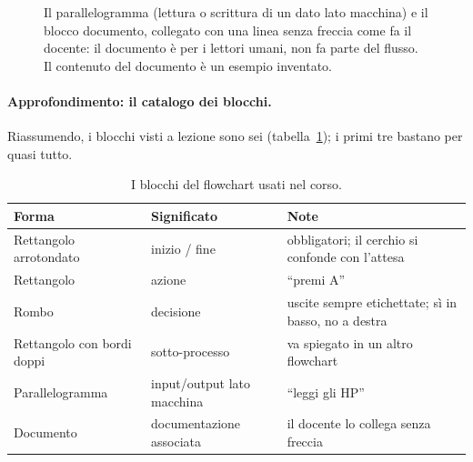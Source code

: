 \begin{figure}[htbp]
\centering
{}
\caption{Il parallelogramma (lettura o scrittura di un dato lato macchina) e
il blocco documento, collegato con una linea senza freccia come fa il
docente: il documento è per i lettori umani, non fa parte del flusso. Il
contenuto del documento è un esempio inventato.}
\label{fig:fc-io-documento}
\end{figure}

\paragraph{Approfondimento: il catalogo dei blocchi.} Riassumendo, i blocchi
visti a lezione sono sei (tabella~\ref{tab:blocchi-flowchart}); i primi
tre bastano per quasi tutto.

\begin{table}[htbp]
\centering
\small
\begin{tabular}{@{}llp{5.6cm}@{}}
\toprule
\textbf{Forma} & \textbf{Significato} & \textbf{Note} \\
\midrule
Rettangolo arrotondato & inizio / fine & obbligatori; il cerchio si
  confonde con l'attesa \\
Rettangolo & azione & ``premi A'' \\
Rombo & decisione & uscite sempre etichettate; sì in basso, no a destra \\
\addlinespace
Rettangolo con bordi doppi & sotto-processo & va spiegato in un altro
  flowchart \\
Parallelogramma & input/output lato macchina & ``leggi gli HP'' \\
Documento & documentazione associata & il docente lo collega senza
  freccia \\
\bottomrule
\end{tabular}
\caption{I blocchi del flowchart usati nel corso.}
\label{tab:blocchi-flowchart}
\end{table}

